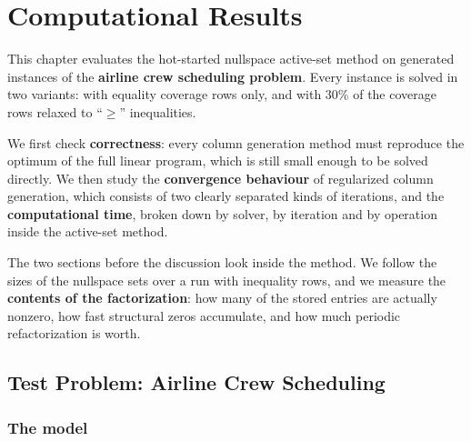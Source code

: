 \chapter{Computational Results}
\label{chap:results}

\vspace*{\fill}

This chapter evaluates the hot-started nullspace active-set method on generated instances of
the \textbf{airline crew scheduling problem}. Every instance is solved in two variants: with
equality coverage rows only, and with 30\% of the coverage rows relaxed to ``$\ge$''
inequalities.

\medskip

We first check \textbf{correctness}: every column generation method must reproduce the
optimum of the full linear program, which is still small enough to be solved directly. We
then study the \textbf{convergence behaviour} of regularized column generation, which
consists of two clearly separated kinds of iterations, and the \textbf{computational time},
broken down by solver, by iteration and by operation inside the active-set method.

\medskip

The two sections before the discussion look inside the method. We follow the sizes of the nullspace sets
over a run with inequality rows, and we measure the \textbf{contents of the factorization}:
how many of the stored entries are actually nonzero, how fast structural zeros accumulate,
and how much periodic refactorization is worth.

\vspace*{\fill}

\newpage


\section{Test Problem: Airline Crew Scheduling}
\label{sec:test-problem}

\subsection{The model}

